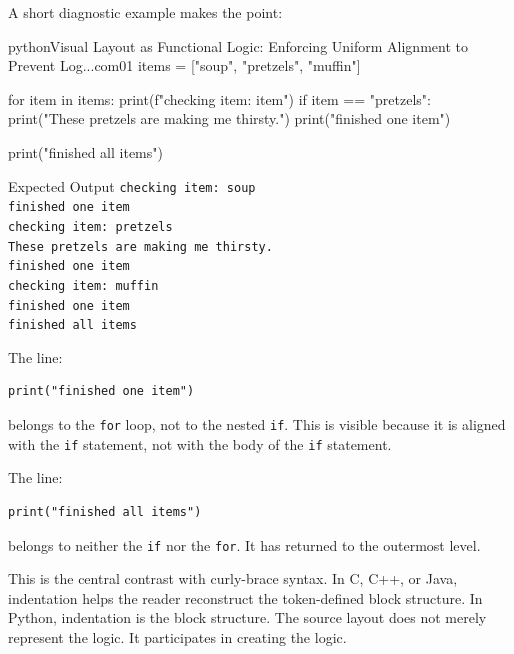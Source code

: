 A short diagnostic example makes the point:

\begin{codebox}[]{python}{Visual Layout as Functional Logic: Enforcing Uniform Alignment to Prevent Log...}{com01}
items = ["soup", "pretzels", "muffin"]

for item in items:
    print(f"checking item: {item}")
    if item == "pretzels":
        print("These pretzels are making me thirsty.")
    print("finished one item")

print("finished all items")
\end{codebox}


\begin{iobox}{Expected Output}
\texttt{checking item: soup} \\
\texttt{finished one item} \\
\texttt{checking item: pretzels} \\
\texttt{These pretzels are making me thirsty.} \\
\texttt{finished one item} \\
\texttt{checking item: muffin} \\
\texttt{finished one item} \\
\texttt{finished all items} \\
\end{iobox}


The line:

\begin{verbatim}
print("finished one item")
\end{verbatim}

belongs to the \texttt{for} loop, not to the nested \texttt{if}. This is visible because it is aligned with the \texttt{if} statement, not with the body of the \texttt{if} statement.

The line:

\begin{verbatim}
print("finished all items")
\end{verbatim}

belongs to neither the \texttt{if} nor the \texttt{for}. It has returned to the outermost level.

This is the central contrast with curly-brace syntax. In C, C++, or Java, indentation helps the reader reconstruct the token-defined block structure. In Python, indentation is the block structure. The source layout does not merely represent the logic. It participates in creating the logic.